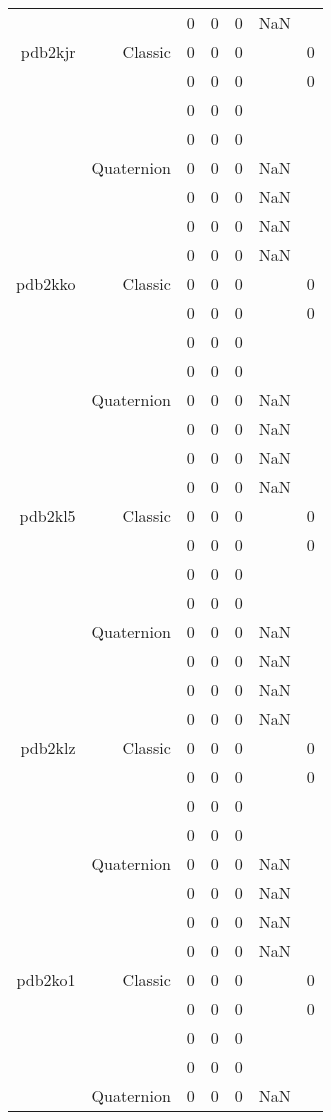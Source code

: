 \begin{xltabular}{\textwidth}{r|rcccSc}
& & 0 & 0 & 0 & NaN & \\ \addlinespace
pdb2kjr & Classic & 0 & 0 & 0 & & 0 \\
& & 0 & 0 & 0 & & 0 \\
& & 0 & 0 & 0 & & \\
& & 0 & 0 & 0 & & \\
& Quaternion & 0 & 0 & 0 & NaN & \\
& & 0 & 0 & 0 & NaN & \\
& & 0 & 0 & 0 & NaN & \\
& & 0 & 0 & 0 & NaN & \\ \addlinespace
pdb2kko & Classic & 0 & 0 & 0 & & 0 \\
& & 0 & 0 & 0 & & 0 \\
& & 0 & 0 & 0 & & \\
& & 0 & 0 & 0 & & \\
& Quaternion & 0 & 0 & 0 & NaN & \\
& & 0 & 0 & 0 & NaN & \\
& & 0 & 0 & 0 & NaN & \\
& & 0 & 0 & 0 & NaN & \\ \addlinespace
pdb2kl5 & Classic & 0 & 0 & 0 & & 0 \\
& & 0 & 0 & 0 & & 0 \\
& & 0 & 0 & 0 & & \\
& & 0 & 0 & 0 & & \\
& Quaternion & 0 & 0 & 0 & NaN & \\
& & 0 & 0 & 0 & NaN & \\
& & 0 & 0 & 0 & NaN & \\
& & 0 & 0 & 0 & NaN & \\ \addlinespace
pdb2klz & Classic & 0 & 0 & 0 & & 0 \\
& & 0 & 0 & 0 & & 0 \\
& & 0 & 0 & 0 & & \\
& & 0 & 0 & 0 & & \\
& Quaternion & 0 & 0 & 0 & NaN & \\
& & 0 & 0 & 0 & NaN & \\
& & 0 & 0 & 0 & NaN & \\
& & 0 & 0 & 0 & NaN & \\ \addlinespace
pdb2ko1 & Classic & 0 & 0 & 0 & & 0 \\
& & 0 & 0 & 0 & & 0 \\
& & 0 & 0 & 0 & & \\
& & 0 & 0 & 0 & & \\
& Quaternion & 0 & 0 & 0 & NaN & \\

\end{xltabular}

